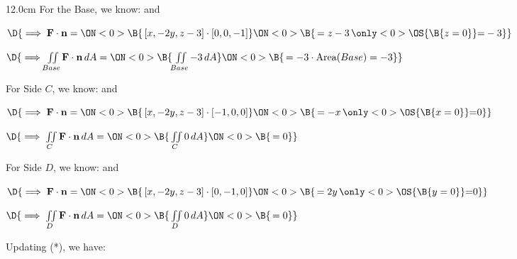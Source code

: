 \begin{frame}
\begin{columns}\begin{column}{12.0cm}
\scriptsize
For the Base, we know: \quad 
{} \quad and \quad 
{}

\vspace{0.1cm}

$\D{\implies {\bf F} \cdot {\bf n} = 
\ON<0>{\B{ \, [x,-2y,z-3] \cdot [0,0,-1]}}
\ON<0>{\B{\, = z - 3 \,\only<0>{\OS{\B{ z=0 }}}{ = } -3}}}$ 

\vspace{0.2cm}

$\D{\implies \iint \limits_{Base} {\bf F} \cdot {\bf n}\, dA = 
\ON<0>{\B{\, \iint \limits_{Base} -3 \, dA }}
\ON<0>{\B{\, = -3 \cdot \text{Area}(Base) = -3}}}$ 

\vspace{0.4cm}

For Side $C$, we know: \quad 
{} \quad and \quad 
{}

\vspace{0.1cm}

$\D{\implies {\bf F} \cdot {\bf n} = 
\ON<0>{\B{ \, [x,-2y,z-3] \cdot [-1,0,0]}}
\ON<0>{\B{\, = -x \,\only<0>{\OS{\B{ x=0 }}}{ = } 0}}}$ 

\vspace{0.2cm}

$\D{\implies \iint \limits_{C} {\bf F} \cdot {\bf n}\, dA = 
\ON<0>{\B{\, \iint \limits_{C} 0 \, dA }}
\ON<0>{\B{\, = 0}}}$

\vspace{0.4cm}

For Side $D$, we know: \quad 
{} \quad and \quad 
{}

\vspace{0.1cm}

$\D{\implies {\bf F} \cdot {\bf n} = 
\ON<0>{\B{ \, [x,-2y,z-3] \cdot [0,-1,0]}}
\ON<0>{\B{\, = 2y \,\only<0>{\OS{\B{ y=0 }}}{ = } 0}}}$ 

\vspace{0.2cm}

$\D{\implies \iint \limits_{D} {\bf F} \cdot {\bf n}\, dA = 
\ON<0>{\B{\, \iint \limits_{D} 0 \, dA }}
\ON<0>{\B{\, = 0}}}$

\vspace{0.4cm}

Updating (*), we have:


\end{column}
\end{columns}
\end{frame}

